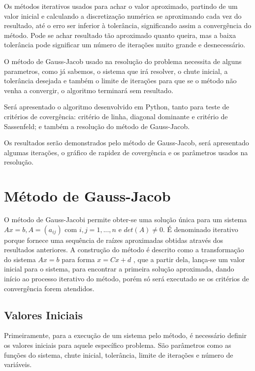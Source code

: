 \documentclass[
	12pt,				%
	openright,			%
	twoside,			%
	a4paper,			%
	english,			%
	french,				%
	spanish,			%
	brazil				%
	]{abntex2_new}
\begin{document}
Os métodos iterativos usados para achar o valor aproximado, partindo de um valor inicial
e calculando a discretização numérica se aproximando cada vez do resultado, até o erro ser inferior à
tolerância, significando assim a convergência do método. Pode se achar resultado tão aproximado quanto
queira, mas a baixa tolerância pode significar um número de iterações muito grande e desnecessário.

O método de Gauss-Jacob usado na resolução do problema necessita de alguns parametros, como já sabemos, 
o sistema que irá resolver, o chute inicial, a tolerância desejada e também o limite de iterações 
para que se o método não venha a convergir, o algoritmo terminará sem resultado.

Será apresentado o algoritmo desenvolvido em Python, tanto para teste de critérios de covergência: 
critério de linha, diagonal dominante e critério de Sassenfeld; e também a resolução do método de 
Gauss-Jacob.

Os resultados serão demonstrados pelo método de Gauss-Jacob, será apresentado algumas iterações,
o gráfico de rapidez de covergência e os parâmetros usados na resolução.

\chapter{Método de Gauss-Jacob}

O método de Gauss-Jacobi permite obter-se uma solução única para um sistema $Ax=b, A = (a_{ij} ) $ com 
$i,j=1,...,n$ e $det(A) \neq 0$. É denominado iterativo porque fornece uma sequência de raízes aproximadas
obtidas através dos resultados anteriores. A construção do método é descrito como a transformação do 
sistema $Ax = b$ para forma $x = Cx + d$ , que a partir dela, lança-se um valor inicial para o sistema, 
para encontrar a primeira solução aproximada, dando início ao processo iterativo do método, porém 
só será executado se os critérios de convergência forem atendidos.

\section{Valores Iniciais}
Primeiramente, para a execução de um sistema pelo método, é 
necessário definir os valores iniciais para aquele 
específico problema. São parâmetros como as funções do
 sistema,
chute inicial, tolerância, limite de iterações e número
de variáveis.
\end{document}
